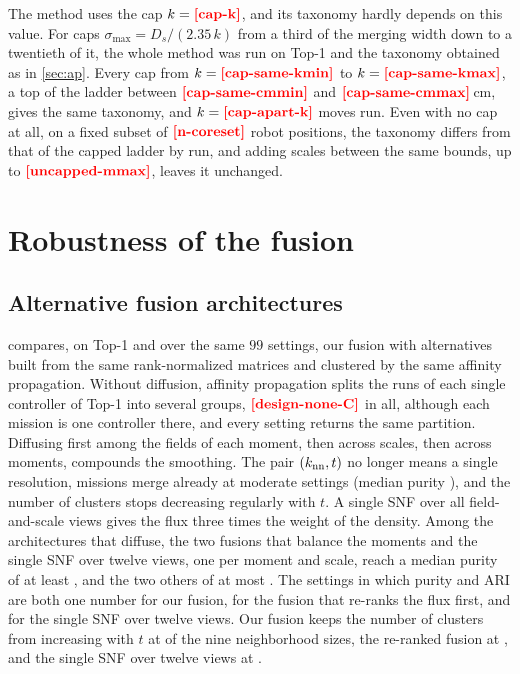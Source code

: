 The method uses the cap $k=\nm{cap-k}$, and its taxonomy hardly depends on this value. For caps
$\sigma_{\max}=D_s/(2.35\,k)$ from a third of the merging width down to a twentieth of it, the whole method was run on
Top-1 and the taxonomy obtained as in \cref{sec:ap}. Every cap from $k=\nm{cap-same-kmin}$ to $k=\nm{cap-same-kmax}$, a
top of the ladder between $\nm{cap-same-cmmin}$ and $\nm{cap-same-cmmax}$\,cm, gives the same taxonomy, and
$k=\nm{cap-apart-k}$ moves  run. Even with no cap at all, on a fixed subset of $\nm{n-coreset}$ robot
positions, the taxonomy differs from that of the capped ladder by  run, and adding scales between
the same bounds, up to $\nm{uncapped-mmax}$, leaves it unchanged.

\section{Robustness of the fusion}
\label{app:fusion}

\subsection{Alternative fusion architectures}
 compares, on Top-1 and over the same $99$ settings, our fusion with
alternatives built from the same rank-normalized matrices and clustered by the same affinity
propagation. Without diffusion, affinity propagation splits the runs of each single controller of
Top-1 into several groups, $\nm{design-none-C}$ in all, although each mission is one controller there,
and every setting returns the same partition. Diffusing first among the
fields of each moment, then across scales, then across moments, compounds the smoothing. The pair $(k_{\mathrm{nn}},t)$
no longer means a single resolution, missions merge already at moderate settings (median purity
), and the number of clusters stops decreasing regularly with $t$.
A single SNF
over all field-and-scale views gives the flux three times the weight of the density. Among the
architectures that diffuse, the two fusions that balance the moments and the single SNF over twelve views, one per
moment and scale, reach a median purity of at least , and the two others of at most
. The settings in
which purity and ARI are both one number  for our fusion, 
for the fusion that re-ranks the flux first, and  for the single SNF over twelve views.
Our fusion keeps the number of clusters from increasing with $t$ at  of the nine
neighborhood sizes, the re-ranked fusion at , and the single SNF over twelve views at
.

